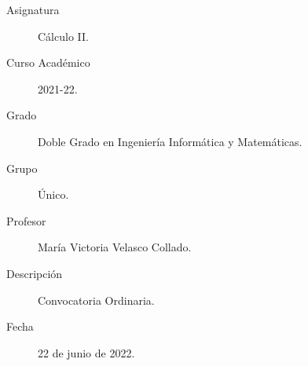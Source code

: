 \documentclass[12pt]{article}
\begin{document}

    
    

    \begin{description}
        \item[Asignatura] Cálculo II.
        \item[Curso Académico] 2021-22.
        \item[Grado] Doble Grado en Ingeniería Informática y Matemáticas.
        \item[Grupo] Único.
        \item[Profesor] María Victoria Velasco Collado.
        \item[Descripción] Convocatoria Ordinaria.
        \item[Fecha] 22 de junio de 2022.
    
    \end{description}
    \newpage
    
\end{document}
